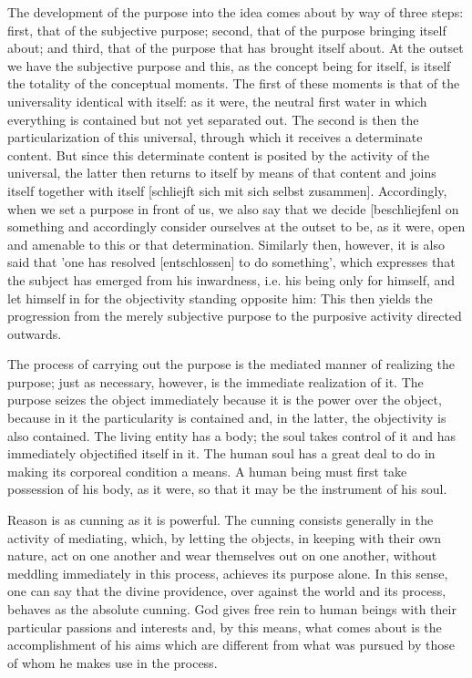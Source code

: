The development of the purpose into the idea comes about by way
of three steps: first, that of the subjective purpose; second, that of the purpose
bringing itself about; and third, that of the purpose that has
brought itself about. At the outset we have the subjective purpose and this, as
the concept being for itself, is itself the totality of the conceptual moments. The
first of these moments is that of the universality identical with itself: as it were, the
neutral first water in which everything is contained but not yet separated out. The
second is then the particularization of this universal, through which it receives a
determinate content. But since this determinate content is posited by the activity
of the universal, the latter then returns to itself by means of that content and
joins itself together with itself [schliejft sich mit sich selbst zusammen]. Accordingly,
when we set a purpose in front of us, we also say that we decide [beschliejfenl
on something and accordingly consider ourselves at the outset to be, as it were,
open and amenable to this or that determination. Similarly then, however, it is
also said that 'one has resolved [entschlossen] to do something', which expresses
that the subject has emerged from his inwardness, i.e. his being only for himself,
and let himself in for the objectivity standing opposite him: This then yields the
progression from the merely subjective purpose to the purposive activity directed
outwards.

The process of carrying out the purpose is
the mediated manner of realizing the purpose;
just as necessary, however, is the immediate realization of it.
The purpose seizes the object immediately
because it is the power over the object,
because in it the particularity is contained and,
in the latter, the objectivity is also contained.
The living entity has a body;
the soul takes control of it
and has immediately objectified itself in it.
The human soul has a great deal to do in making its corporeal condition a means.
A human being must first take possession of his body, as it were,
so that it may be the instrument of his soul.

Reason is as cunning as it is powerful. The cunning consists generally
in the activity of mediating, which, by letting the objects, in keeping with their
own nature, act on one another and wear themselves out on one another, without
meddling immediately in this process, achieves its purpose alone. In this sense, one
can say that the divine providence, over against the world and its process, behaves
as the absolute cunning. God gives free rein to human beings with their particular
passions and interests and, by this means, what comes about is the accomplishment
of his aims which are different from what was pursued by those of whom he makes
use in the process.

